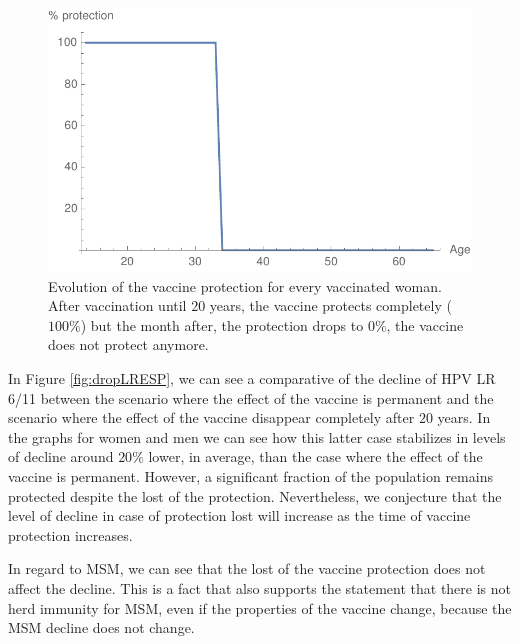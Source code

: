 \begin{figure}[h!]
	\centering
	\includegraphics[width=0.5\linewidth]{IMGs/5.-Caida_brusca/grafica_perdida_proteccion.pdf}
	\caption{Evolution of the vaccine protection for every vaccinated woman. After vaccination until $20$ years, the vaccine protects completely ($100\%$) but the month after, the protection drops to $0\%$, the vaccine does not protect anymore.}
	\label{fig:perdida_proteccion}
\end{figure}

In Figure \ref{fig:dropLRESP}, we can see a comparative of the decline of HPV LR 6/11 between the scenario where the effect of the vaccine is permanent and the scenario where the effect of the vaccine disappear completely after $20$ years. In the graphs for women and men we can see how this latter case stabilizes in levels of decline around $20\%$ lower, in average, than the case where the effect of the vaccine is permanent. However, a significant fraction of the population remains protected despite the lost of the protection. Nevertheless, we conjecture that the level of decline in case of protection lost will increase as the time of vaccine protection increases. 

In regard to MSM, we can see that the lost of the vaccine protection does not affect the decline. This is a fact that also supports the statement that there is not herd immunity for MSM, even if the properties of the vaccine change, because the MSM decline does not change.

